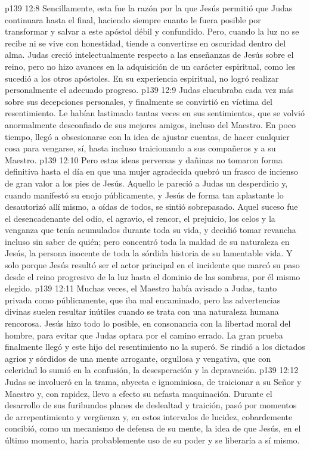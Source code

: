 \vs p139 12:8 Sencillamente, esta fue la razón por la que Jesús permitió que Judas continuara hasta el final, haciendo siempre cuanto le fuera posible por transformar y salvar a este apóstol débil y confundido. Pero, cuando la luz no se recibe ni se vive con honestidad, tiende a convertirse en oscuridad dentro del alma. Judas creció intelectualmente respecto a las enseñanzas de Jesús sobre el reino, pero no hizo avances en la adquisición de un carácter espiritual, como les sucedió a los otros apóstoles. En su experiencia espiritual, no logró realizar personalmente el adecuado progreso.
\vs p139 12:9 \pc Judas elucubraba cada vez más sobre sus decepciones personales, y finalmente se convirtió en víctima del resentimiento. Le habían lastimado tantas veces en sus sentimientos, que se volvió anormalmente desconfiado de sus mejores amigos, incluso del Maestro. En poco tiempo, llegó a obsesionarse con la idea de ajustar cuentas, de hacer cualquier cosa para vengarse, sí, hasta incluso traicionando a sus compañeros y a su Maestro.
\vs p139 12:10 Pero estas ideas perversas y dañinas no tomaron forma definitiva hasta el día en que una mujer agradecida quebró un frasco de incienso de gran valor a los pies de Jesús. Aquello le pareció a Judas un desperdicio y, cuando manifestó su enojo públicamente, y Jesús de forma tan aplastante lo desautorizó allí mismo, a oídas de todos, se sintió sobrepasado. Aquel suceso fue el desencadenante del odio, el agravio, el rencor, el prejuicio, los celos y la venganza que tenía acumulados durante toda su vida, y decidió tomar revancha incluso sin saber de quién; pero concentró toda la maldad de su naturaleza en Jesús, la  persona inocente de toda la sórdida historia de su lamentable vida. Y solo porque Jesús resultó ser el actor principal en el incidente que marcó su paso desde el reino progresivo de la luz hasta el dominio de las sombras, por él mismo elegido.
\vs p139 12:11 Muchas veces, el Maestro había avisado a Judas, tanto privada como públicamente, que iba mal encaminado, pero las advertencias divinas suelen resultar inútiles cuando se trata con una naturaleza humana rencorosa. Jesús hizo todo lo posible, en consonancia con la libertad moral del hombre, para evitar que Judas optara por el camino errado. La gran prueba finalmente llegó y este hijo del resentimiento no la superó. Se rindió a los dictados agrios y sórdidos de una mente arrogante, orgullosa y vengativa, que con celeridad lo sumió en la confusión, la desesperación y la depravación.
\vs p139 12:12 Judas se involucró en la trama, abyecta e ignominiosa, de traicionar a su Señor y Maestro y, con rapidez, llevo a efecto su nefasta maquinación. Durante el desarrollo de sus furibundos planes de deslealtad y traición, pasó por momentos de arrepentimiento y vergüenza y, en estos intervalos de lucidez, cobardemente concibió, como un mecanismo de defensa de su mente, la idea de que Jesús, en el último momento, haría probablemente uso de su poder y se liberaría a sí mismo.
